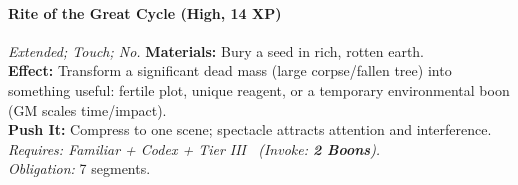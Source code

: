 \paragraph{Rite of the Great Cycle (High, 14 XP)} \emph{Extended; Touch; No.}
\textbf{Materials:} Bury a seed in rich, rotten earth. \\
\textbf{Effect:} Transform a significant dead mass (large corpse/fallen tree) into something useful: fertile plot, unique reagent, or a temporary environmental boon (GM scales time/impact). \\
\textbf{Push It:} Compress to one scene; spectacle attracts attention and interference. \\
\emph{Requires: Familiar + Codex + Tier III \ (\textit{Invoke:} \textbf{2 Boons}).} \\
\emph{Obligation:} 7 segments.
